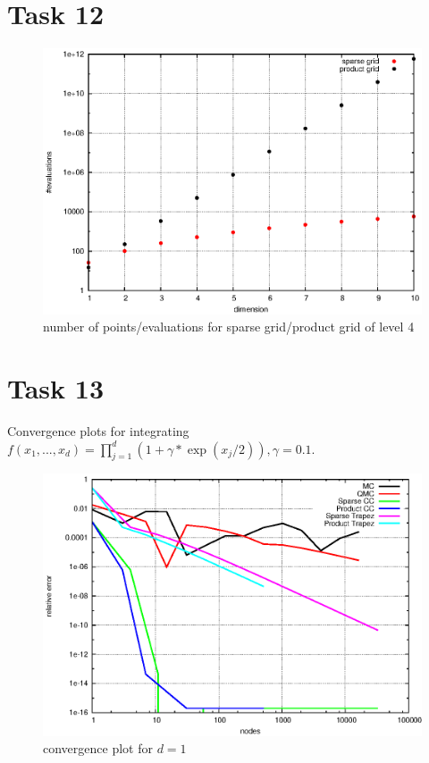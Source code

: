 \documentclass[]{article}
\begin{document}
\section*{Task 12}
\begin{figure}[!ht]
\includegraphics[width=.9\textwidth]{task12}
\caption{number of points/evaluations for sparse grid/product grid of level 4}
\label{fig:Task12}
\end{figure}


\section*{Task 13}
Convergence plots for integrating $f(x_1,...,x_d)=\prod_{j=1}^d (1+\gamma*\exp(x_j/2)),\gamma=0.1$.\\
\begin{figure}[!ht]
\includegraphics[width=.9\textwidth]{task13_d1}
\caption{convergence plot for $d=1$}
\label{fig:Task13a}
\end{figure}
\end{document}

